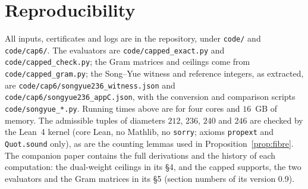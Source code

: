 \section{Reproducibility}
All inputs, certificates and logs are in the repository, under
\texttt{code/} and \texttt{code/cap6/}. The evaluators are
\texttt{code/capped\_exact.py} and \texttt{code/capped\_check.py}; the Gram
matrices and ceilings come from \texttt{code/capped\_gram.py}; the Song--Yue
witness and reference integers, as extracted, are
\texttt{code/cap6/songyue236\_witness.json} and
\texttt{code/cap6/songyue236\_appC.json}, with the conversion and comparison
scripts \texttt{code/songyue\_*.py}. Running times above are for four cores
and $16$~GB of memory. The admissible tuples of diameters $212$, $236$, $240$
and $246$ are checked by the Lean~4 kernel (core Lean, no Mathlib, no
\texttt{sorry}; axioms \texttt{propext} and \texttt{Quot.sound} only), as are
the counting lemmas used in Proposition~\ref{prop:fibre}. The companion paper
\cite{Kim26} contains the full derivations and the history of each
computation: the dual-weight ceilings in its \S4, and the capped supports,
the two evaluators and the Gram matrices in its \S5 (section numbers of its
version 0.9).

